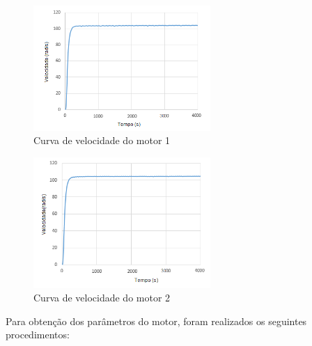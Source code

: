 \documentclass[]{politex}
\begin{document}
 \begin{figure}[H]
     \centering
     \includegraphics[width=0.6\textwidth]{imagens/velMotor1.png}
     \caption{Curva de velocidade do motor 1}
     \label{CM2}
 \end{figure}

 \begin{figure}[H]
     \centering
     \includegraphics[width=0.6\textwidth]{imagens/velMotor2.png}
     \caption{Curva de velocidade do motor 2}
     \label{CM3}
 \end{figure}

Para obtenção dos parâmetros do motor, foram realizados os seguintes procedimentos: 
\end{document}
